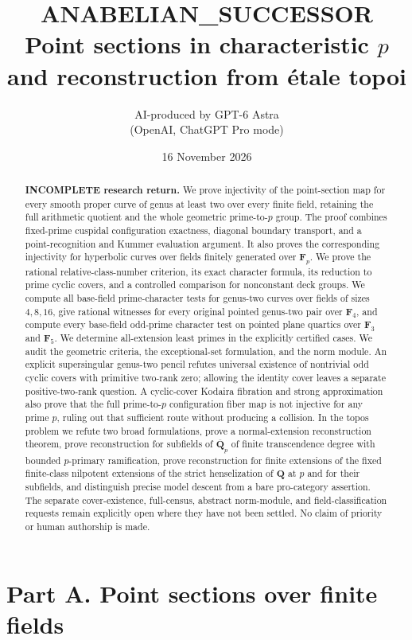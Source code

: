 \documentclass[11pt]{article}
\title{ANABELIAN\_SUCCESSOR\\Point sections in characteristic $p$\\and reconstruction from \'etale topoi}
\author{AI-produced by GPT-6 Astra\\(OpenAI, ChatGPT Pro mode)}
\date{16 November 2026}
\begin{document}
\maketitle
\begin{abstract}
\textbf{INCOMPLETE research return.}
We prove injectivity of the point-section map for every smooth proper
curve of genus at least two over every finite field, retaining the full
arithmetic quotient and the whole geometric prime-to-$p$ group.
The proof combines fixed-prime cuspidal configuration exactness,
diagonal boundary transport, and a point-recognition and Kummer
evaluation argument. It also proves the corresponding injectivity for
hyperbolic curves over fields finitely generated over $\mathbf F_p$.
We prove the rational relative-class-number criterion, its exact character
formula, its reduction to prime cyclic covers, and a controlled comparison
for nonconstant deck groups. We compute all base-field prime-character
tests for genus-two curves over fields of sizes $4,8,16$, give rational
witnesses for every original pointed genus-two pair over $\mathbf F_4$,
and compute every base-field odd-prime character test on pointed plane
quartics over $\mathbf F_3$ and $\mathbf F_5$. We determine all-extension least primes in
the explicitly certified cases. We audit the geometric
criteria, the exceptional-set formulation, and the norm module. An explicit
supersingular genus-two pencil refutes universal existence of nontrivial
odd cyclic covers with primitive two-rank zero; allowing the identity
cover leaves a separate positive-two-rank question. A cyclic-cover
Kodaira fibration and strong approximation also prove that the full
prime-to-$p$ configuration fiber map is not injective for any prime $p$,
ruling out that sufficient route without producing a collision. In the
topos problem we refute two broad formulations, prove a normal-extension
reconstruction theorem, prove reconstruction for subfields of
$\overline{\mathbf Q}_p$ of finite transcendence degree with bounded
$p$-primary ramification, prove reconstruction for finite extensions of the
fixed finite-class nilpotent extensions of the strict henselization of
$\mathbf Q$ at $p$ and for their subfields, and distinguish
precise model descent from a
bare pro-category assertion. The separate cover-existence, full-census,
abstract norm-module, and field-classification requests remain explicitly
open where they have not been settled. No claim of priority or human
authorship is made.
\end{abstract}
\tableofcontents
\section{Part A. Point sections over finite fields}
\end{document}
